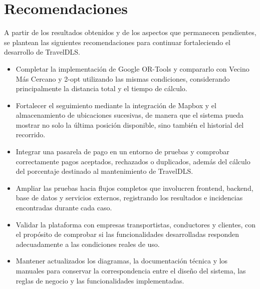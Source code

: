 \section{Recomendaciones}

A partir de los resultados obtenidos y de los aspectos que permanecen pendientes, se plantean las siguientes recomendaciones para continuar fortaleciendo el desarrollo de TravelDLS.

\begin{itemize}
	\item Completar la implementación de Google OR-Tools y compararlo con Vecino Más Cercano y 2-opt utilizando las mismas condiciones, considerando principalmente la distancia total y el tiempo de cálculo.
	
	\item Fortalecer el seguimiento mediante la integración de Mapbox y el almacenamiento de ubicaciones sucesivas, de manera que el sistema pueda mostrar no solo la última posición disponible, sino también el historial del recorrido.
	
	\item Integrar una pasarela de pago en un entorno de pruebas y comprobar correctamente pagos aceptados, rechazados o duplicados, además del cálculo del porcentaje destinado al mantenimiento de TravelDLS.
	
	\item Ampliar las pruebas hacia flujos completos que involucren frontend, backend, base de datos y servicios externos, registrando los resultados e incidencias encontradas durante cada caso.
	
	\item Validar la plataforma con empresas transportistas, conductores y clientes, con el propósito de comprobar si las funcionalidades desarrolladas responden adecuadamente a las condiciones reales de uso.
	
	\item Mantener actualizados los diagramas, la documentación técnica y los manuales para conservar la correspondencia entre el diseño del sistema, las reglas de negocio y las funcionalidades implementadas.
\end{itemize}